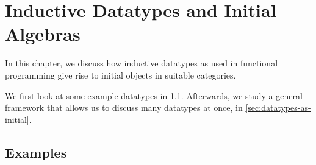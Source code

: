 
\chapter{Inductive Datatypes and Initial Algebras}
\label{sec:initial-algs}

In this chapter, we discuss how inductive datatypes as used in functional programming give rise to initial objects in suitable categories.

We first look at some example datatypes in \cref{sec:examples}.
Afterwards, we study a general framework that allows us to discuss many datatypes at once, in \cref{sec:datatypes-as-initial}.

\section{Examples}
\label{sec:examples}

